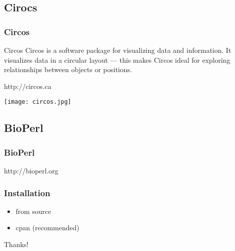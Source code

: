 \documentclass[UTF8]{beamer}
\begin{document}
\subsection{Cirocs}
\begin{frame}
  \frametitle{Circos}
  \begin{block}{Circos}
    Circos is a software package for visualizing data and information. It
    visualizes data in a circular layout — this makes Circos ideal for
    exploring relationships between objects or positions.
  \end{block}
  \centerline{http://circos.ca}
\end{frame}

\begin{frame}
  \texttt{[image: circos.jpg]}
\end{frame}

\subsection{BioPerl}

\begin{frame}
  \frametitle{BioPerl}
  \centerline{http://bioperl.org}
\end{frame}

\begin{frame}
  \frametitle{Installation}
  \begin{itemize}
    \item from source
    \item cpan (recommended)
  \end{itemize}
\end{frame}


\begin{frame}
  \centerline{\huge{Thanks!}}
\end{frame}
\end{document}
